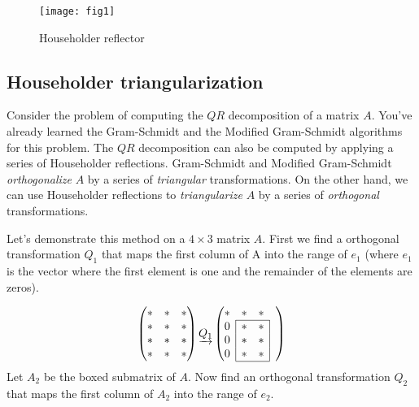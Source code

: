 \begin{figure}
	\centering
	\texttt{[image: fig1]}
	\caption{Householder reflector}
	\label{fig:Householder_reflector}
\end{figure}

\subsection*{Householder triangularization}
Consider the problem of computing the $QR$ decomposition of a matrix $A$.
You've already learned the Gram-Schmidt and the Modified Gram-Schmidt algorithms for this problem.
The $QR$ decomposition can also be computed by applying a series of Householder reflections.
Gram-Schmidt and Modified Gram-Schmidt \emph{orthogonalize} $A$ by a series of \emph{triangular} transformations.
On the other hand, we can use Householder reflections to \emph{triangularize} $A$ by a series of \emph{orthogonal} transformations.

Let's demonstrate this method on a $4 \times 3$ matrix $A$.
First we find a orthogonal transformation $Q_1$ that maps the first column of A into the range of $e_1$
(where $e_1$ is the vector where the first element is one and the remainder of the elements are zeros).

\def\mc#1{\multicolumn{1}{c|}{#1}}
\begin{equation*}
\begin{pmatrix}
\ast & \ast & \ast \\
\ast & \ast & \ast \\
\ast & \ast & \ast \\
\ast & \ast & \ast 
\end{pmatrix}
\underrightarrow{Q_1}
\begin{pmatrix}

\ast & \ast & \ast & \\ \cline{2-3}
\mc{0} & \ast & \mc{\ast}& \\
\mc{0} & \ast & \mc{\ast} & \\
\mc{0}& \ast & \mc{\ast} & \\ \cline{2-3}
\end{pmatrix}
\end{equation*}
Let $A_2$ be the boxed submatrix of $A$.
Now find an orthogonal transformation $Q_2$ that maps the first column of $A_2$ into the range of $e_2$.

